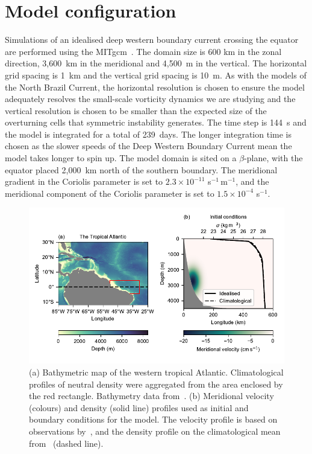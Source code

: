 \section{Model configuration}
\label{sec:methods}
Simulations of an idealised deep western boundary current crossing the equator are performed using the MITgcm~\citep{Marshall1997}. The domain size is 600 km in the zonal direction, 3,600~km in the meridional and 4,500~m in the vertical. The horizontal grid spacing is 1~km and the vertical grid spacing is 10~m. As with the models of the North Brazil Current, the horizontal resolution is chosen to ensure the model adequately resolves the small-scale vorticity dynamics we are studying and the vertical resolution is chosen to be smaller than the expected size of the overturning cells that symmetric instability generates\footnotemark. The time step is 144~s and the model is integrated for a total of 239~days. The longer integration time is chosen as the slower speeds of the Deep Western Boundary Current mean the model takes longer to spin up. The model domain is sited on a $\beta$-plane, with the equator placed 2,000~km north of the southern boundary. The meridional gradient in the Coriolis parameter is set to $2.3 \times 10^{-11}$ s$^{-1}\,$m$^{-1}$, and the meridional component of the Coriolis parameter is set to $1.5 \times 10^{-4}$ s$^{-1}$.

\begin{figure}[h]
    \centering
    \includegraphics[width=\textwidth]{../figures/Figure1.pdf}
    \caption{(a) Bathymetric map of the western tropical Atlantic. Climatological profiles of neutral density were aggregated from the area enclosed by the red rectangle. Bathymetry data from~\citet{GEBCO2020}. (b) Meridional velocity (colours) and density (solid line) profiles used as initial and boundary conditions for the model. The velocity profile is based on observations by~\citet{Schott2005}, and the density profile on the climatological mean from~\citet{WOA2018} (dashed line).}
    \label{fig:fig1}
\end{figure}

